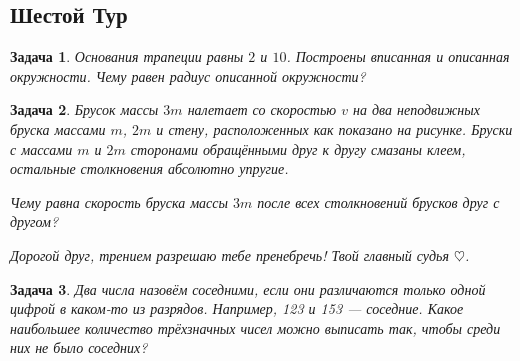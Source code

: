 \documentclass[a4paper, 11pt]{article}
\theoremstyle{break}
\newtheorem{problem}{Задача}[subsection]
\begin{document}
\thispagestyle{empty}
\subsection*{Шестой Тур}

\begin{problem}
Основания трапеции равны $2$ и $10$. Построены вписанная и описанная окружности.
Чему равен радиус описанной окружности?
\end{problem}

\begin{problem}
Брусок массы $3m$ налетает со скоростью $v$ на два неподвижных бруска массами $m$, $2m$
и стену, расположенных как показано на рисунке. Бруски с массами $m$ и $2m$
сторонами обращёнными друг к другу смазаны клеем, остальные столкновения абсолютно
упругие.

\begin{minipage}{0.8\textwidth}
\begin{center}
\end{center}
\end{minipage}


Чему равна скорость бруска массы $3m$ после всех столкновений брусков друг с другом?

Дорогой друг, трением разрешаю тебе пренебречь! Твой главный судья $\heartsuit$.
\end{problem}


\begin{problem}
Два числа назовём соседними, если они различаются только одной цифрой
в каком-то из разрядов. Например, 123 и 153 — соседние. Какое наибольшее количество
трёхзначных чисел можно выписать так, чтобы среди них не было соседних?
\end{problem}
\end{document}
